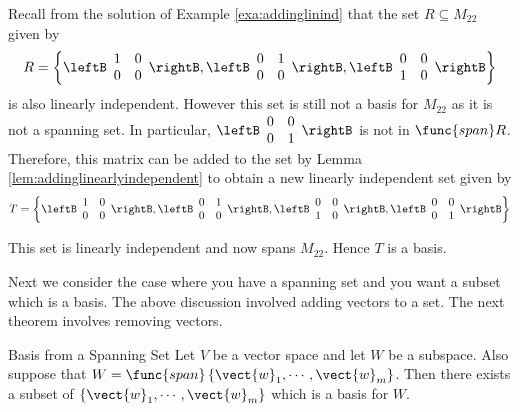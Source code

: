 \begin{solution}
Recall from the solution of Example \ref{exa:addinglinind} that the set  $R \subseteq M_{22}$ given by 
\[
R = \left\{ \leftB \begin{array}{rr}
1 & 0 \\
0 & 0 
\end{array} \rightB, \leftB \begin{array}{rr}
0 & 1 \\
0 & 0 
\end{array} \rightB, \leftB \begin{array}{rr}
0 & 0 \\
1 & 0 
\end{array} \rightB \right\}
\]
is also linearly independent.
However this set is still not a basis for $M_{22}$ as it is not a spanning set. In particular, $\leftB \begin{array}{rr}
0 & 0 \\
0 & 1 
\end{array} \rightB$ is not in $\func{span} R$. Therefore, this matrix can be added to the set by Lemma \ref{lem:addinglinearlyindependent} to obtain a new linearly independent set given by 
\[
T = \left\{ \leftB \begin{array}{rr}
1 & 0 \\
0 & 0 
\end{array} \rightB, \leftB \begin{array}{rr}
0 & 1 \\
0 & 0 
\end{array} \rightB, \leftB \begin{array}{rr}
0 & 0 \\
1 & 0 
\end{array} \rightB, \leftB \begin{array}{rr}
0 & 0 \\
0 & 1 
\end{array} \rightB \right\}
\]

This set is linearly independent and now spans $M_{22}$. Hence $T$ is a basis. 
\end{solution}

Next we consider the case where you have a
spanning set and you want a subset which is a basis. The above discussion involved adding vectors to a set. The next theorem involves removing vectors. 

\begin{theorem}{Basis from a Spanning Set}{}
Let $V$ be a vector space and let $W$ be a subspace. Also
suppose that $W=\func{span}\left\{ \vect{w}_{1},\cdots ,\vect{w}
_{m}\right\} $. Then there exists a subset of $\left\{ \vect{w}_{1},\cdots ,
\vect{w}_{m}\right\} $ which is a basis for $W$.
\end{theorem}


